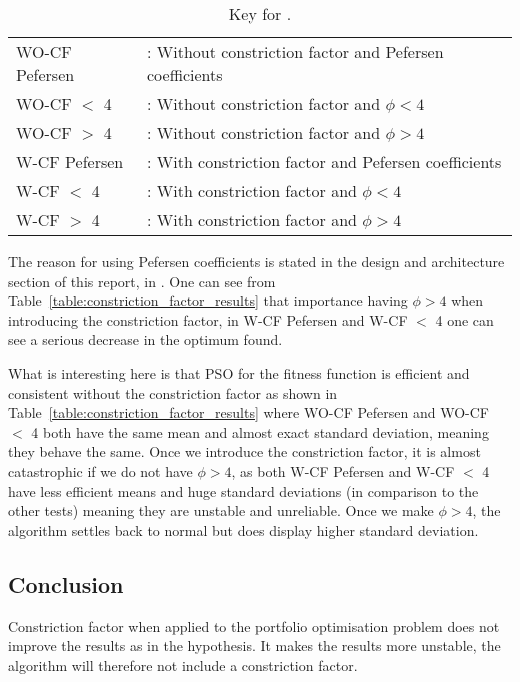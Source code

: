         \begin{table}[H]
          \setlength{\extrarowheight}{2.0pt}
          \begin{tabular}{ l l }
            WO-CF Pefersen & : Without constriction factor and Pefersen coefficients  \\
            WO-CF $<$ 4 & : Without constriction factor and $\phi < 4$ \\
            WO-CF $>$ 4 & : Without constriction factor and $\phi > 4$ \\
            W-CF Pefersen & : With constriction factor and Pefersen coefficients  \\
            W-CF $<$ 4 & : With constriction factor and $\phi < 4$ \\
            W-CF $>$ 4 & : With constriction factor and $\phi > 4$ \\
          \end{tabular}
          \caption{Key for .}
          \label{table:key_constriction_factor_results}
        \end{table}

      The reason for using Pefersen coefficients is stated in the design and architecture section of this report,  in . One can see from Table~\ref{table:constriction_factor_results} that importance having $\phi > 4$ when introducing the constriction factor, in W-CF Pefersen and W-CF $<$ 4 one can see a serious decrease in the optimum found. 

      What is interesting here is that PSO for the fitness function is efficient and consistent without the constriction factor as shown in Table~\ref{table:constriction_factor_results} where WO-CF Pefersen and WO-CF $<$ 4 both have the same mean and almost exact standard deviation, meaning they behave the same. Once we introduce the constriction factor, it is almost catastrophic if we do not have $\phi > 4$, as both W-CF Pefersen and W-CF $<$ 4 have less efficient means and huge standard deviations (in comparison to the other tests) meaning they are unstable and unreliable. Once we make $\phi > 4$, the algorithm settles back to normal but does display higher standard deviation. 
    \subsection{Conclusion} %
    \label{sub:conclusion}
      Constriction factor when applied to the portfolio optimisation problem does not improve the results as in the hypothesis. It makes the results more unstable, the algorithm will therefore not include a constriction factor. 

